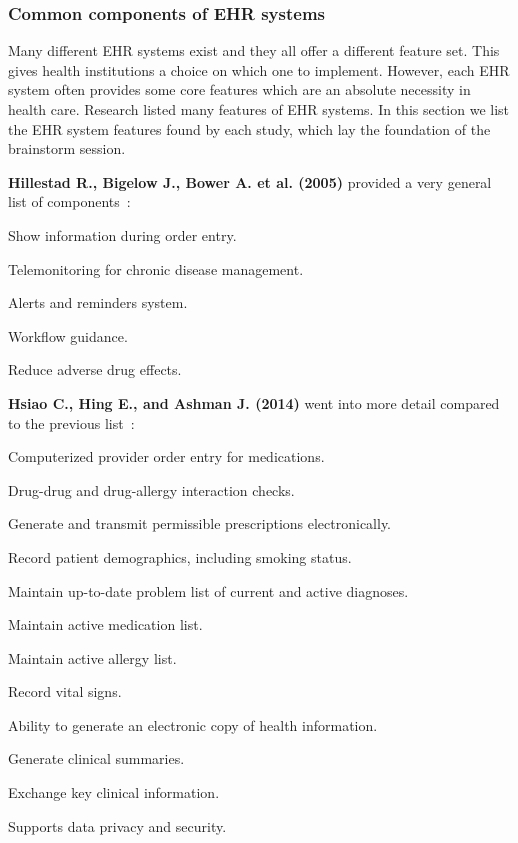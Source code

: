         \subsubsection{Common components of EHR systems}

        Many different EHR systems exist and they all offer a different feature set. This gives health institutions a choice on which one to implement. However, each EHR system often provides some core features which are an absolute necessity in health care. Research listed many features of EHR systems. In this section we list the EHR system features found by each study, which lay the foundation of the brainstorm session.\bigskip

        \noindent \textbf{Hillestad R., Bigelow J., Bower A. et al. (2005)} provided a very general list of components~\cite{Hillestad2005}:
        \vspace{-\topsep}
        \begin{multicols}{2}
            \begin{myitemize}
                \item Show information during order entry.
                \item Telemonitoring for chronic disease management.
                \item Alerts and reminders system.
                \item Workflow guidance.
                \item Reduce adverse drug effects.
            \end{myitemize}
        \end{multicols}

        \noindent \textbf{Hsiao C., Hing E., and Ashman J. (2014)} went into more detail compared to the previous list~\cite{Hsiao2014}:
        \vspace{-0.5\topsep}
        \begin{myitemize}
            \item Computerized provider order entry for medications.
            \item Drug-drug and drug-allergy interaction checks.
            \item Generate and transmit permissible prescriptions electronically.
            \item Record patient demographics, including smoking status.
            \item Maintain up-to-date problem list of current and active diagnoses.
            \item Maintain active medication list.
            \item Maintain active allergy list.
            \item Record vital signs.
            \item Ability to generate an electronic copy of health information.
            \item Generate clinical summaries.
            \item Exchange key clinical information.
            \item Supports data privacy and security.
        \end{myitemize}

